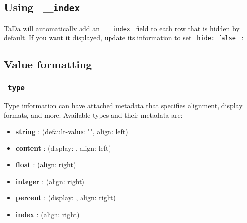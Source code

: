 
\subsection{\texorpdfstring{Using
\texttt{\ \_\_index\ }}{Using  \_\_index }}\label{using-__index}

TaDa will automatically add an \texttt{\ \_\_index\ } field to each row
that is hidden by default. If you want it displayed, update its
information to set \texttt{\ hide:\ false\ } :

\begin{Shaded}
\begin{Highlighting}[]
\NormalTok{)}
\end{Highlighting}
\end{Shaded}


\subsection{Value formatting}\label{value-formatting}

\subsubsection{\texorpdfstring{\texttt{\ type\ }}{ type }}\label{type}

Type information can have attached metadata that specifies alignment,
display formats, and more. Available types and their metadata are:

\begin{itemize}
\item
  \textbf{string} : (default-value: "", align: left)
\item
  \textbf{content} : (display: , align: left)
\item
  \textbf{float} : (align: right)
\item
  \textbf{integer} : (align: right)
\item
  \textbf{percent} : (display: , align: right)
\item
  \textbf{index} : (align: right)
\end{itemize}


